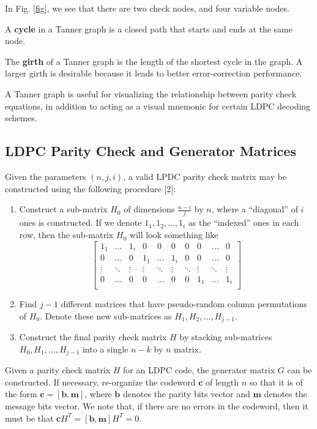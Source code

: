 \documentclass[conference]{IEEEtran}
\begin{document}
In Fig. \ref{fig}, we see that there are two check nodes, and four variable nodes.

A \textbf{cycle} in a Tanner graph is a closed path that starts and ends at the same node.

The \textbf{girth} of a Tanner graph is the length of the shortest cycle in the graph.
A larger girth is desirable because it leads to better error-correction performance.

A Tanner graph is useful for visualizing the relationship between parity check equations, in addition to acting as a visual mnemonic for certain LDPC decoding schemes.

\subsection{LDPC Parity Check and Generator Matrices}\label{matrices}
Given the parameters $(n,j,i)$, a valid LPDC parity check matrix may be constructed using the following procedure [2]:
\begin{enumerate}
  \item Construct a sub-matrix $H_0$ of dimensions $\frac{n-i}{j}$ by $n$, where a ``diagonal'' of $i$ ones is constructed.
    If we denote $1_1, 1_2, \ldots, 1_i$ as the ``indexed'' ones in each row, then the sub-matrix $H_0$ will look something like
    $$\begin{bmatrix}
      1_1   &\ldots& 1_i  & 0    & 0    & 0    & 0    &0     &\ldots& 0\\
      0     &\ldots& 0    & 1_1  &\ldots& 1_i  & 0    &0     &\ldots& 0\\
      \vdots&\ddots&\vdots&\vdots&\ddots&\vdots&\ddots&\vdots&\ddots&\vdots \\
      0     &\ldots& 0    & 0    &\ldots& 0    & 0    & 1_1  &\ldots& 1_i \\
    \end{bmatrix}$$
  \item Find $j - 1$ different matrices that have pseudo-random column permutations of $H_0$. Denote these new sub-matrices as $H_1, H_2, \ldots, H_{j-1}$.
  \item Construct the final parity check matrix $H$ by stacking sub-matrices $H_0,H_1,\ldots,H_{j-1}$ into a single $n-k$ by $n$ matrix.
\end{enumerate}

Given a parity check matrix $H$ for an LDPC code, the generator matrix $G$ can
be constructed.
If necessary, re-organize the codeword $\textbf{c}$ of length $n$ so that it is of the form $\textbf{c} = [\textbf{b}, \textbf{m}]$, where $\textbf{b}$ denotes the parity bits vector and $\textbf{m}$ denotes the message bits vector.
    We note that, if there are no errors in the codeword, then it must be that $\textbf{c}H^T = [\textbf{b}, \textbf{m}]H^T = 0$.
\end{document}
